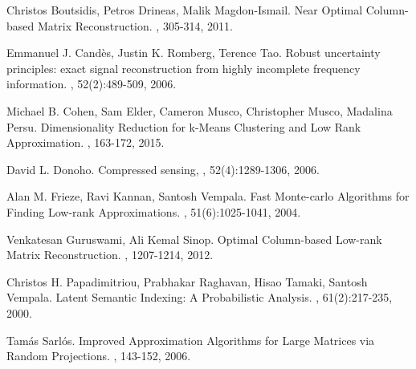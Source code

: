 \documentclass[11pt]{article}
\begin{document}
\begin{thebibliography}{42}

Christos Boutsidis, Petros Drineas, Malik Magdon-Ismail.
\newblock Near Optimal Column-based Matrix Reconstruction.
, 305-314, 2011.

Emmanuel J. Cand{\`{e}}s, Justin K. Romberg, Terence Tao.
\newblock  Robust uncertainty principles: exact signal reconstruction from highly incomplete frequency information.
, 52(2):489-509, 2006.

Michael B. Cohen, Sam Elder, Cameron Musco, Christopher Musco, Madalina Persu.
\newblock Dimensionality Reduction for k-Means Clustering and Low Rank Approximation.
, 163-172, 2015.

David L. Donoho.
\newblock Compressed sensing,
, 52(4):1289-1306, 2006.

Alan M. Frieze, Ravi Kannan, Santosh Vempala.
\newblock Fast Monte-carlo Algorithms for Finding Low-rank Approximations.
, 51(6):1025-1041, 2004.

Venkatesan Guruswami, Ali Kemal Sinop.
\newblock Optimal Column-based Low-rank Matrix Reconstruction.
, 1207-1214, 2012.

Christos H. Papadimitriou, Prabhakar Raghavan, Hisao Tamaki, Santosh Vempala.
\newblock Latent Semantic Indexing: A Probabilistic Analysis.
, 61(2):217-235, 2000.

Tam\'{a}s Sarl\'{o}s.
\newblock Improved Approximation Algorithms for Large Matrices via Random Projections.
, 143-152, 2006.

\end{thebibliography}
\end{document}
